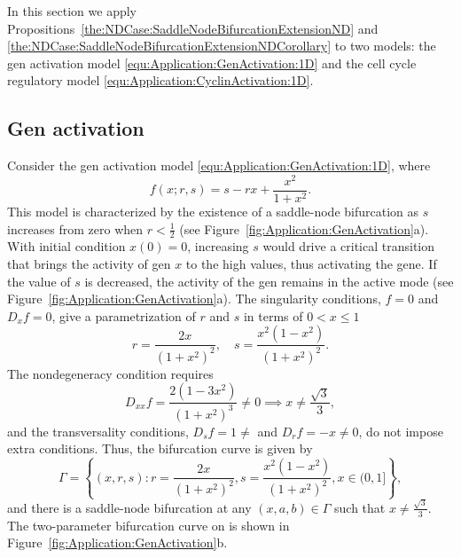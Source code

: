 \documentclass[12pt]{article}
\begin{document}
In this section we apply Propositions~\ref{the:NDCase:SaddleNodeBifurcationExtensionND} and \ref{the:NDCase:SaddleNodeBifurcationExtensionNDCorollary} to two models: the gen activation model \eqref{equ:Application:GenActivation:1D} and the cell cycle regulatory model \eqref{equ:Application:CyclinActivation:1D}.

\subsection{Gen activation}

Consider the gen activation model \eqref{equ:Application:GenActivation:1D}, where 
\[f(x;r,s)=s-rx+\frac{x^{2}}{1+x^{2}}.\]
This model is characterized by the existence of a saddle-node bifurcation as $s$ increases from zero when $r<\tfrac{1}{2}$ (see Figure~\ref{fig:Application:GenActivation}a). With initial condition $x(0)=0$, increasing $s$ would drive a critical transition that brings the activity of gen $x$ to the high values, thus activating the gene. If the value of $s$ is decreased, the activity of the gen remains in the active mode (see Figure~\ref{fig:Application:GenActivation}a).
The singularity conditions, $f=0$ and $D_{x}f=0$, give a parametrization of $r$ and $s$ in terms of $0< x\leq 1$
\[
r=\frac{2x}{(1+x^{2})^{2}}, \quad s = \frac{x^{2}(1-x^{2})}{(1+x^{2})^{2}}.
\]
The nondegeneracy condition requires
\[
D_{xx}f = \frac{2(1-3x^{2})}{(1+x^{2})^{3}}\neq 0 \implies x\neq \frac{\sqrt{3}}{3},
\]
and the transversality conditions, $D_{s}f=1\neq$ and $D_{r}f=-x\neq 0 $, do not impose extra conditions. Thus, the bifurcation curve is given by
\begin{equation}
    \Gamma = \left\{ (x,r,s) : r=\frac{2x}{(1+x^{2})^{2}}, s = \frac{x^{2}(1-x^{2})}{(1+x^{2})^{2}}, x\in (0,1]\right\},
    \label{equ:Application:GenActivation:Gamma}
\end{equation}
and there is a saddle-node bifurcation at any $(x,a,b)\in\Gamma$ such that $x\neq\frac{\sqrt{3}}{3}$. The two-parameter bifurcation curve on is shown in Figure~\ref{fig:Application:GenActivation}b.
\end{document}
